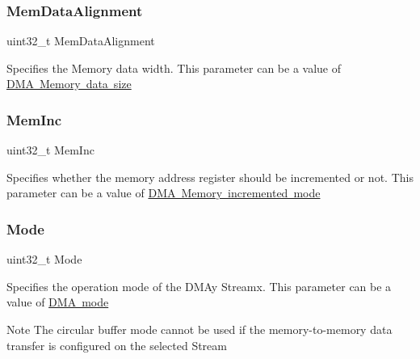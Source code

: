 \subsubsection{\texorpdfstring{Mem\+Data\+Alignment}{MemDataAlignment}}
{\footnotesize\ttfamily uint32\+\_\+t Mem\+Data\+Alignment}

Specifies the Memory data width. This parameter can be a value of \mbox{\hyperlink{group___d_m_a___memory__data__size}{D\+MA Memory data size}} \mbox{\label{struct_d_m_a___init_type_def_a831756fbcd64feb1e570a9bf743b5b8d}} 
\subsubsection{\texorpdfstring{Mem\+Inc}{MemInc}}
{\footnotesize\ttfamily uint32\+\_\+t Mem\+Inc}

Specifies whether the memory address register should be incremented or not. This parameter can be a value of \mbox{\hyperlink{group___d_m_a___memory__incremented__mode}{D\+MA Memory incremented mode}} \mbox{\label{struct_d_m_a___init_type_def_a0ffc93ec511ed9cf1663f6939bd3e839}} 
\subsubsection{\texorpdfstring{Mode}{Mode}}
{\footnotesize\ttfamily uint32\+\_\+t Mode}

Specifies the operation mode of the D\+M\+Ay Streamx. This parameter can be a value of \mbox{\hyperlink{group___d_m_a__mode}{D\+MA mode}} \begin{DoxyNote}{Note}
The circular buffer mode cannot be used if the memory-\/to-\/memory data transfer is configured on the selected Stream 
\end{DoxyNote}
\mbox{\label{struct_d_m_a___init_type_def_ae95b14383c9d0c86405939f4bfe2882d}} 
